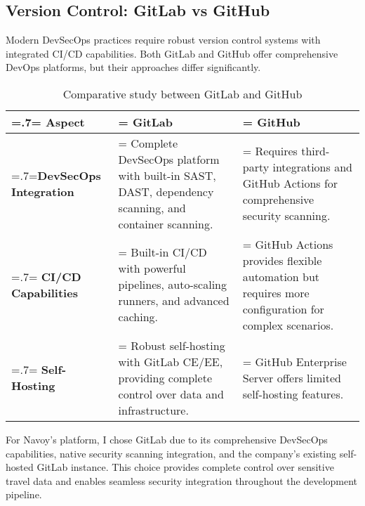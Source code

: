 \subsection{Version Control: GitLab vs GitHub}
Modern DevSecOps practices require robust version control systems with integrated CI/CD capabilities. Both GitLab and GitHub offer comprehensive DevOps platforms, but their approaches differ significantly.

\begin{table}[H]
    \renewcommand{\arraystretch}{1.5}%
    \caption{Comparative study between GitLab and GitHub}
    \centering
    \medskip
    \begin{tabularx}{1\textwidth} {
            | >{\hsize=.7\hsize\linewidth=\hsize\centering\arraybackslash}X
            | >{\hsize=1.15\hsize\linewidth=\hsize\justifying\arraybackslash}X
            | >{\hsize=1.15\hsize\linewidth=\hsize\justifying\arraybackslash}X |}
        \hline
        \rowcolor{primary} \textbf {Aspect} & \textbf {GitLab}                                                                                             & \textbf {GitHub}                                                                                             \\
        \hline
        \textbf {DevSecOps Integration}     & \noindent Complete DevSecOps platform with built-in SAST, DAST, dependency scanning, and container scanning. & \noindent Requires third-party integrations and GitHub Actions for comprehensive security scanning.          \\
        \hline
        \textbf {CI/CD Capabilities}        & \noindent Built-in CI/CD with powerful pipelines, auto-scaling runners, and advanced caching.                & \noindent GitHub Actions provides flexible automation but requires more configuration for complex scenarios. \\
        \hline
        \textbf {Self-Hosting}              & \noindent Robust self-hosting with GitLab CE/EE, providing complete control over data and infrastructure.    & \noindent GitHub Enterprise Server offers limited self-hosting features.                                     \\
        \hline
    \end{tabularx}
\end{table}

For Navoy's platform, I chose GitLab due to its comprehensive DevSecOps capabilities, native security scanning integration, and the company's existing self-hosted GitLab instance. This choice provides complete control over sensitive travel data and enables seamless security integration throughout the development pipeline.


